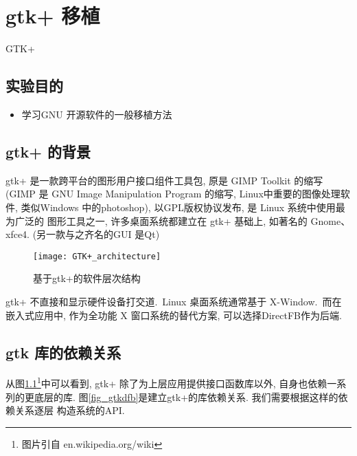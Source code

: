 \chapter{gtk+ 移植}{GTK+}

\section{实验目的}
\begin{itemize}\itemsep=-3pt
  \item 学习GNU 开源软件的一般移植方法
\end{itemize}

\section{gtk+ 的背景}
    gtk+ 是一款跨平台的图形用户接口组件工具包, 原是 GIMP Toolkit 的缩写
(GIMP 是 GNU Image Manipulation Program 的缩写, Linux中重要的图像处理软件,
类似Windows 中的photoshop), 以GPL版权协议发布, 是 Linux 系统中使用最为广泛的
图形工具之一, 许多桌面系统都建立在 gtk+ 基础上, 如著名的 Gnome、xfce4.
(另一款与之齐名的GUI 是Qt)

\begin{figure}[h]
  \centering
  \texttt{[image: GTK+\_architecture]}
  \caption{基于gtk+的软件层次结构}\label{fig_gtk}
\end{figure}

    gtk+ 不直接和显示硬件设备打交道.~Linux 桌面系统通常基于 X-Window.~而在
嵌入式应用中, 作为全功能 X 窗口系统的替代方案, 可以选择DirectFB作为后端. 

\section{gtk 库的依赖关系}
从图\ref{fig_gtk}\footnote{图片引自 en.wikipedia.org/wiki}中可以看到, 
gtk+ 除了为上层应用提供接口函数库以外, 自身也依赖一系列的更底层的库.
图\ref{fig_gtkdfb}是建立gtk+的库依赖关系. 我们需要根据这样的依赖关系逐层
构造系统的API.\@

